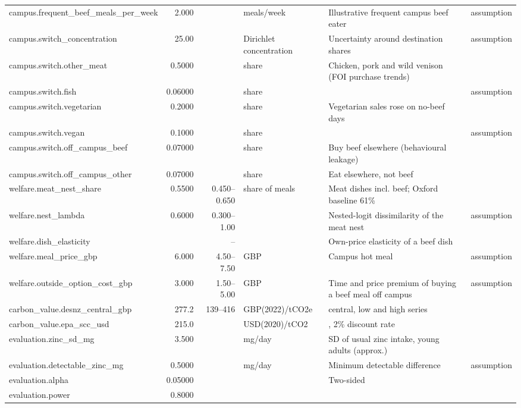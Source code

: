 \begin{longtable}{>{\raggedright\arraybackslash}p{4.2cm}rr>{\raggedright\arraybackslash}p{2.2cm}>{\raggedright\arraybackslash}p{5.4cm}l}
campus.frequent\_beef\_meals\_per\_week & 2.000 &  & meals/week & Illustrative frequent campus beef eater & assumption \\
campus.switch\_concentration & 25.00 &  & Dirichlet concentration & Uncertainty around destination shares & assumption \\
campus.switch.other\_meat & 0.5000 &  & share & Chicken, pork and wild venison (FOI purchase trends) & \cite{imperialfoi,merk2024} \\
campus.switch.fish & 0.06000 &  & share &  & assumption \\
campus.switch.vegetarian & 0.2000 &  & share & Vegetarian sales rose on no-beef days & \cite{merk2024,garnett2019} \\
campus.switch.vegan & 0.1000 &  & share &  & assumption \\
campus.switch.off\_campus\_beef & 0.07000 &  & share & Buy beef elsewhere (behavioural leakage) & \cite{russo2025,merk2024} \\
campus.switch.off\_campus\_other & 0.07000 &  & share & Eat elsewhere, not beef & \cite{russo2025} \\
welfare.meat\_nest\_share & 0.5500 & 0.450--0.650 & share of meals & Meat dishes incl. beef; Oxford baseline 61\% & \cite{pechey2022,garnett2019} \\
welfare.nest\_lambda & 0.6000 & 0.300--1.00 &  & Nested-logit dissimilarity of the meat nest & assumption \\
welfare.dish\_elasticity & \textminus 1.500 & \textminus 3.00--\textminus 0.800 &  & Own-price elasticity of a beef dish & \cite{garnett2021,salvi2025} \\
welfare.meal\_price\_gbp & 6.000 & 4.50--7.50 & GBP & Campus hot meal & assumption \\
welfare.outside\_option\_cost\_gbp & 3.000 & 1.50--5.00 & GBP & Time and price premium of buying a beef meal off campus & assumption \\
carbon\_value.desnz\_central\_gbp & 277.2 & 139--416 & GBP(2022)/tCO2e & 2026 central, low and high series & \cite{desnz2023carbon} \\
carbon\_value.epa\_scc\_usd & 215.0 &  & USD(2020)/tCO2 & 2026, 2\% discount rate & \cite{epa2023scghg} \\
evaluation.zinc\_sd\_mg & 3.500 &  & mg/day & SD of usual zinc intake, young adults (approx.) & \cite{ndns2020} \\
evaluation.detectable\_zinc\_mg & 0.5000 &  & mg/day & Minimum detectable difference & assumption \\
evaluation.alpha & 0.05000 &  &  & Two-sided &  \\
evaluation.power & 0.8000 &  &  &  &  \\
\bottomrule
\end{longtable}
